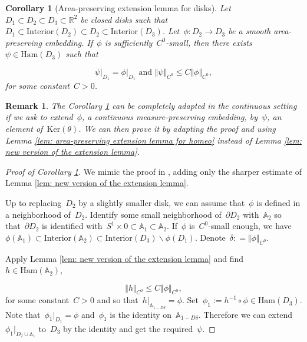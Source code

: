 \documentclass[10pt]{amsart}
\newtheorem{rk}[prop]{Remark}
\newtheorem{coro}{Corollary}
\newcommand{\Ham}{\mathrm{Ham}}
\newcommand{\Ker}{\mathrm{Ker}}
\begin{document}
\begin{coro}[Area-preserving extension lemma for disks]\label{coro: area-preserving extension lemma for disks}
Let~$D_1\subset D_2 \subset D_3 \subset \mathbb{R}^2$ be closed disks such that~$D_1\subset \text{Interior} (D_2)\subset D_2 \subset \text{Interior}(D_3)$. Let~$\phi: D_2 \rightarrow D_3$ be a smooth area-preserving embedding. If~$\phi$ is sufficiently~$C^0$-small, then there exists~$\psi \in \Ham(D_3)$ such that 

$$\psi\vert _{D_1}=\phi\vert_{D_1} \text{ and } \Vert\psi\Vert_{C^0}\leq C \Vert\phi\Vert_{C^0},$$
for some constant~$C>0$.
\end{coro}

\begin{rk}
The Corollary \ref{coro: area-preserving extension lemma for disks} can be completely adapted in the continuous setting if we ask to extend~$\phi$, a continuous measure-preserving embedding, by~$\psi$, an element of~$\Ker(\theta)$. We can then prove it by adapting the proof and using Lemma \ref{lem: area-preserving extension lemma for homeo} instead of Lemma \ref{lem: new version of the extension lemma}.
\end{rk}

\begin{proof}[Proof of Corollary \ref{coro: area-preserving extension lemma for disks}]
We mimic the proof in \cite{EPP}, adding only the sharper estimate of Lemma \ref{lem: new version of the extension lemma}.

Up to replacing~$D_2$ by a slightly smaller disk, we can assume that~$\phi$ is defined in a neighborhood of~$D_2$. Identify some small neighborhood of~$\partial D_2$ with~$\mathbb{A}_2$ so that~$\partial D_2$ is identified with~$S^1\times 0\subset \mathbb{A}_1 \subset \mathbb{A}_2$. If~$\phi$ is~$C^0$-small enough, we have~$\phi(\mathbb{A}_1)\subset \text{Interior}(\mathbb{A}_2)\subset \text{Interior}(D_3)\backslash \phi(D_1)$. Denote~$\delta: = \Vert\phi\Vert_{C^0}$.

Apply Lemma \ref{lem: new version of the extension lemma} and find~$h\in \text{Ham}(\mathbb{A}_2)$,

$$\Vert h\Vert_{C^0}\leq C \Vert\phi\Vert_{C^0},$$
for some constant~$C>0$ and so that~$h\vert_{\mathbb{A}_{1-D\delta}}=\phi$. Set~$\phi_1:=h^{-1}\circ \phi \in \text{Ham}(D_3)$. Note that~$\phi_1\vert_{D_1}=\phi$ and~$\phi_1$ is the identity on~$\mathbb{A}_{1-D\delta}$. Therefore we can extend~$\phi_1\vert_{D_2\cup \mathbb{A}_1}$ to~$D_3$ by the identity and get the required~$\psi$.
\end{proof}
\end{document}
